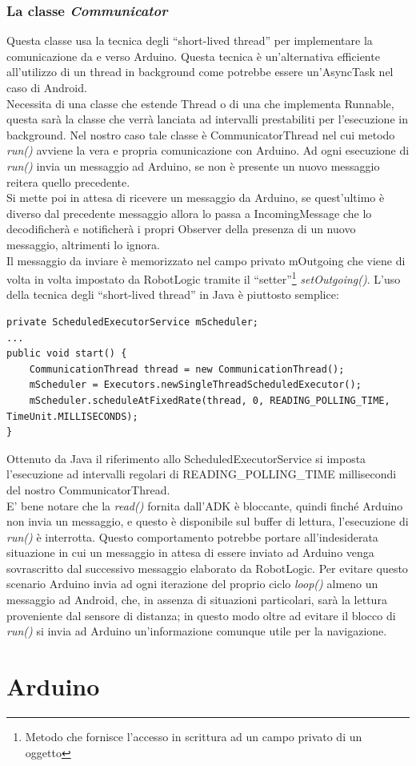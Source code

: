 \subsubsection{La classe \emph{Communicator}}
Questa classe usa la tecnica degli ``short-lived thread'' per implementare la comunicazione da e verso
Arduino. Questa tecnica è un'alternativa efficiente all'utilizzo di un thread in background come 
potrebbe essere un'AsyncTask nel caso di Android.\\
Necessita di una classe che estende Thread o di una che implementa Runnable, questa 
sarà la classe che verrà lanciata ad intervalli prestabiliti per l'esecuzione in background.
Nel nostro caso tale classe è CommunicatorThread nel cui metodo \emph{run()} avviene
la vera e propria comunicazione con Arduino. Ad ogni esecuzione di \emph{run()} 
invia un messaggio ad Arduino, se non è presente un nuovo messaggio reitera quello precedente.\\
Si mette poi in attesa di ricevere un messaggio da Arduino, se quest'ultimo è 
diverso dal precedente messaggio allora lo passa a IncomingMessage che lo decodificherà
e notificherà i propri Observer della presenza di un nuovo messaggio, altrimenti lo ignora.\\
Il messaggio da inviare è memorizzato nel campo privato mOutgoing che viene di volta 
in volta impostato da RobotLogic tramite il ``setter''\footnote{Metodo che fornisce 
l'accesso in scrittura ad un campo privato di un oggetto} \emph{setOutgoing()}.
L'uso della tecnica degli ``short-lived thread'' in Java è piuttosto semplice:
\begin{lstlisting}[caption=Metodo di inizializzazzione degli short-lived thread in Communicator] 
private ScheduledExecutorService mScheduler;
...
public void start() {
    CommunicationThread thread = new CommunicationThread();
    mScheduler = Executors.newSingleThreadScheduledExecutor();
    mScheduler.scheduleAtFixedRate(thread, 0, READING_POLLING_TIME, TimeUnit.MILLISECONDS);
}
\end{lstlisting}
Ottenuto da Java il riferimento allo ScheduledExecutorService si imposta l'esecuzione ad 
intervalli regolari di READING\_POLLING\_TIME millisecondi del nostro CommunicatorThread.\\ 
E' bene notare che la \emph{read()} fornita dall'ADK è bloccante, quindi finché Arduino
non invia un messaggio, e questo è disponibile sul buffer di lettura, l'esecuzione di 
\emph{run()} è interrotta. Questo comportamento potrebbe portare 
all'indesiderata situazione in cui un messaggio in attesa di essere inviato ad Arduino
venga sovrascritto dal successivo messaggio elaborato da RobotLogic. Per evitare questo scenario
Arduino invia ad ogni iterazione del proprio ciclo \emph{loop()} almeno un messaggio ad
Android, che, in assenza di situazioni particolari, sarà la lettura proveniente dal 
sensore di distanza; in questo modo oltre ad evitare il blocco di \emph{run()} 
si invia ad Arduino un'informazione comunque utile per la navigazione.

\section {Arduino} 
